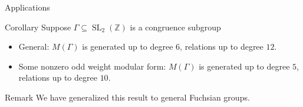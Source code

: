 \documentclass{beamer}
\theoremstyle{remark}
\newcommand\BH{{\mathbb H}}
\newcommand\BC{{\mathbb C}}
\newcommand\BZ{{\mathbb Z}}
\newcommand \sx{{\mathscr X}}
\newcommand{\SL}{\operatorname{SL}}
\begin{document}
\begin{frame}{Applications}
%
%


\begin{block}{Corollary}
Suppose $\Gamma \subseteq \SL_2(\BZ)$ is a congruence subgroup
\begin{itemize}
\item General: $M(\Gamma)$ is generated up to degree $6$, relations up to degree $12$. 
\item Some nonzero odd weight modular form: $M(\Gamma)$ is generated up to degree $5$, relations up to degree $10$.
\end{itemize}
\end{block}

\begin{block}{Remark}
We have generalized this result to general Fuchsian groups.
\end{block}
\end{frame}

%
%
\end{document}
